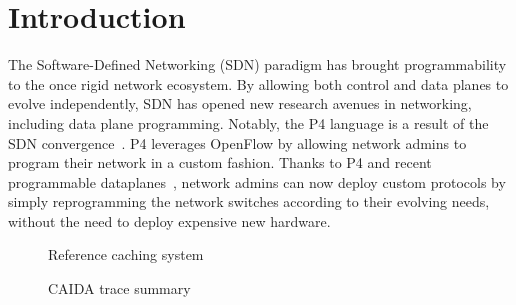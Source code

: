 \section{Introduction}\label{sec:intro}

The Software-Defined Networking (SDN) paradigm has brought programmability to the once rigid network ecosystem.
By allowing both control and data planes to evolve independently, SDN has opened new research avenues in networking, including data plane programming.
Notably, the P4 language is a result of the SDN convergence~\cite{Bosshart:14}.
P4 leverages OpenFlow by allowing network admins to program their network in a custom fashion.
Thanks to P4 and recent programmable dataplanes~\cite{Bosshart:13}, network admins can now deploy custom protocols by simply reprogramming the network switches according to their evolving needs, without the need to deploy expensive new hardware. 

\begin{figure}[]
	\centering
	
	\caption{Reference caching system}
	\label{fig:high_level_network}
\end{figure}

\begin{figure}[]
	\centering
	\caption{CAIDA trace summary}
	\label{fig:traces}
\end{figure}


